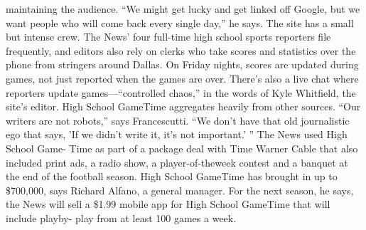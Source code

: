 maintaining the audience. ``We might get lucky and get linked off Google, but
we want people who will come back every single day,'' he says.
The site has a small but intense crew. The News' four full-time high school
sports reporters file frequently, and editors also rely on clerks who take scores
and statistics over the phone from stringers around Dallas. On Friday nights,
scores are updated during games, not just reported when the games are over.
There's also a live chat where reporters
update games—``controlled chaos,'' in
the words of Kyle Whitfield, the site's
editor. High School GameTime aggregates
heavily from other sources. ``Our
writers are not robots,'' says Francescutti.
``We don't have that old journalistic
ego that says, 'If we didn't write it,
it's not important.' ''
The News used High School Game-
Time as part of a package deal with
Time Warner Cable that also included
print ads, a radio show, a player-of-theweek
contest and a banquet at the end
of the football season. High School GameTime has brought in up to \$700,000,
says Richard Alfano, a general manager. For the next season, he says, the News
will sell a \$1.99 mobile app for High School GameTime that will include playby-
play from at least 100 games a week.

